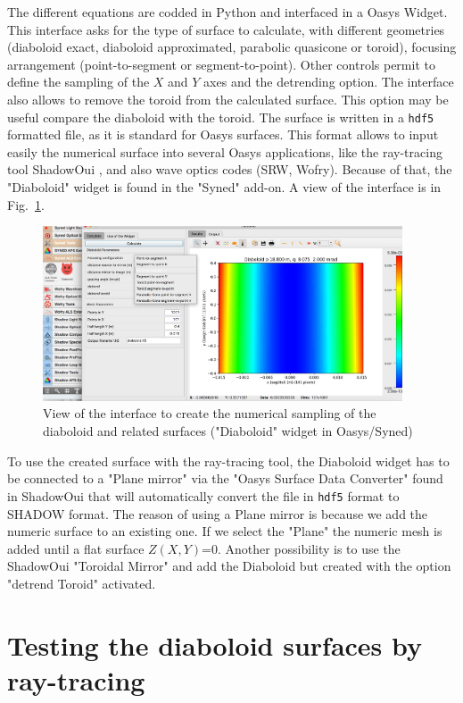 \documentclass{iucr}              %
\begin{document}
The different equations are codded in Python and interfaced in a Oasys Widget. This interface asks for the type of surface to calculate, with different geometries (diaboloid exact, diaboloid approximated, parabolic quasicone or toroid), focusing arrangement (point-to-segment or segment-to-point). Other controls permit to define the sampling of the $X$ and $Y$ axes and the detrending option. The interface also allows to remove the toroid from the calculated surface. This option may be useful compare the diaboloid with the toroid. The surface is written in a {\tt hdf5} formatted file, as it is standard for Oasys surfaces. This format allows to input easily the numerical surface into several Oasys applications, like the ray-tracing tool ShadowOui \cite{codeSHADOWOUI}, and also wave optics codes (SRW, Wofry). Because of that, the "Diaboloid" widget is found in the "Syned" add-on. A view of the interface is in Fig.~\ref{fig:widget}.

\begin{figure}\label{fig:widget}
\centering
\includegraphics[width=0.95\textwidth]{figures/widget.png}
\caption{View of the interface to create the numerical sampling of the diaboloid and related surfaces ("Diaboloid" widget in Oasys/Syned) }
\end{figure}

To use the created surface with the ray-tracing tool, the Diaboloid widget has to be connected to a "Plane mirror" via the "Oasys Surface Data Converter" found in ShadowOui that will automatically convert the file in {\tt hdf5} format to SHADOW format. The reason of using a Plane mirror is because we add the numeric surface to an existing one. If we select the "Plane" the numeric mesh is added until a flat surface $Z(X,Y)$=0. Another possibility is to use the ShadowOui "Toroidal Mirror" and add the Diaboloid but created with the option "detrend Toroid" activated.  

\section{Testing the diaboloid surfaces by ray-tracing}
\label{sec:testing}
\end{document}
